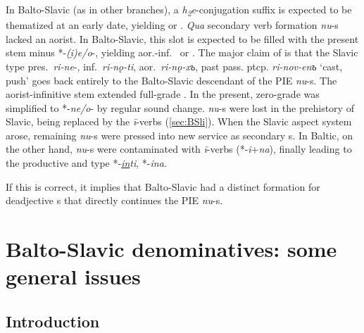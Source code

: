 \documentclass[output=paper,colorlinks,citecolor=brown]{langscibook}
\begin{document}
In Balto-Slavic (as in other branches), a \textit{h\textsubscript{2}}\textit{e}-conjugation suffix is expected to be thematized at an early date, yielding  or . \textit{Qua} secondary verb formation \textit{nu}-s lacked an aorist. In Balto-Slavic, this slot is expected to be filled with the present stem minus *-\textit{(i̯)e/o}-, yielding aor.-inf.\  or . The major claim of \citet{VillanuevaSvenssonforth} is that the Slavic type pres.\ \textit{ri-ne}-, inf.\ \textit{ri-nǫ-ti}, aor.\ \textit{ri-nǫ-xъ}, past pass. ptcp.  \textit{ri-nov-enъ} ‘cast, push’ goes back entirely to the Balto-Slavic descendant of the PIE \textit{nu}-s. The aorist-infinitive stem extended full-grade . In the present, zero-grade  was simplified to *\nobreakdash-\textit{ne/o}- by regular sound change. \textit{nu}-s  were lost in the prehistory of Slavic, being replaced by the \textit{ī}-verbs (\ref{sec:BSli}). When the Slavic aspect system arose, remaining \textit{nu}-s  were pressed into new service as secondary s. In Baltic, on the other hand, \textit{nu}-s  were contaminated with \textit{ī}-verbs (*\nobreakdash-\textit{i}+\textit{na}), finally leading to the productive  and  type *-\textit{\underline{in}ti}, *-\textit{ina}.

If this is correct, it implies that Balto-Slavic had a distinct formation for deadjective  s that directly continues the PIE \textit{nu}-s.

\section{Balto-Slavic denominatives: some general issues}
\label{sec:BSlissues}
\subsection{Introduction}
\label{sec:BSlissuesintro}
\end{document}
